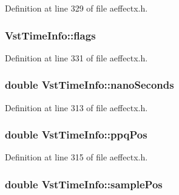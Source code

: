 Definition at line 329 of file aeffectx.\+h.

\subsubsection[{\texorpdfstring{flags}{flags}}]{ Vst\+Time\+Info\+::flags}\hypertarget{class_vst_time_info_a23651d946de653bb35899da6b781b8c5}{}\label{class_vst_time_info_a23651d946de653bb35899da6b781b8c5}


Definition at line 331 of file aeffectx.\+h.

\subsubsection[{\texorpdfstring{nano\+Seconds}{nanoSeconds}}]{\setlength{\rightskip}{0pt plus 5cm}double Vst\+Time\+Info\+::nano\+Seconds}\hypertarget{class_vst_time_info_a752a9e10bb6ad422cccef03999b5ba33}{}\label{class_vst_time_info_a752a9e10bb6ad422cccef03999b5ba33}


Definition at line 313 of file aeffectx.\+h.

\subsubsection[{\texorpdfstring{ppq\+Pos}{ppqPos}}]{\setlength{\rightskip}{0pt plus 5cm}double Vst\+Time\+Info\+::ppq\+Pos}\hypertarget{class_vst_time_info_aa243da6be1161a971983e68be39e7a28}{}\label{class_vst_time_info_aa243da6be1161a971983e68be39e7a28}


Definition at line 315 of file aeffectx.\+h.

\subsubsection[{\texorpdfstring{sample\+Pos}{samplePos}}]{\setlength{\rightskip}{0pt plus 5cm}double Vst\+Time\+Info\+::sample\+Pos}\hypertarget{class_vst_time_info_ad46fad394f437e1b283f2e36285be146}{}\label{class_vst_time_info_ad46fad394f437e1b283f2e36285be146}


